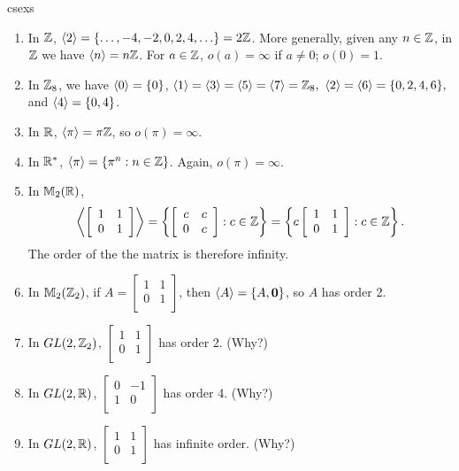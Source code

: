 \begin{example}{csexs}\

\begin{enumerate}
\item In $\mathbb{Z}$, $\langle2\rangle=\{\ldots,-4,-2,0,2,4,\ldots\}=2\mathbb{Z}$. More generally, given any $n\in \mathbb{Z}$, in $\mathbb{Z}$ we have $\langle n\rangle=n\mathbb{Z}$. For $a\in \mathbb{Z}$, $o(a)=\infty$ if $a\neq 0$; $o(0)=1$.

\item In $\mathbb{Z}_8$, we have $\langle0\rangle=\{0\}$, $\langle1\rangle=\langle3\rangle=\langle5\rangle=\langle7\rangle=\mathbb{Z}_8,$ $\langle2\rangle=\langle6\rangle=\{0,2,4,6\},$ and $\langle4\rangle=\{0,4\}$.
\item In $\mathbb{R}$, $\langle\pi\rangle=\pi\mathbb{Z}$, so $o(\pi)=\infty$.
\item In $\mathbb{R}^*$, $\langle\pi\rangle=\{\pi^n:n\in \mathbb{Z}\}$. Again, $o(\pi)=\infty$.
\item In $\mathbb{M}_2(\mathbb{R})$,
$$\left\langle\left[
    \begin{array}{cc}
      1 & 1 \\
      0 & 1 \\
    \end{array}
  \right]\right\rangle=\left\{\left[
    \begin{array}{cc}
      c & c \\
      0 & c \\
    \end{array}
  \right] : c\in \mathbb{Z} \right\}= \left\{c\left[
    \begin{array}{cc}
     1 & 1 \\
      0 & 1 \\
    \end{array}
  \right] : c\in \mathbb{Z} \right\}.$$ The order of the the matrix is therefore infinity.
\item In $\mathbb{M}_2(\mathbb{Z}_2)$, if $A=\left[
    \begin{array}{cc}
      1 & 1 \\
      0 & 1 \\
    \end{array}
  \right]$, then $\langle A\rangle=\{A, \mathbf 0\}$, so $A$ has order 2.
\item In $GL(2,\mathbb{Z}_2)$, $\left[
    \begin{array}{cc}
      1 & 1 \\
      0 & 1 \\
    \end{array}
  \right]$ has order 2. (Why?)
\item In $GL(2,\mathbb{R})$, $\left[
    \begin{array}{cr}
      0 & -1 \\
      1 & 0 \\
    \end{array}
  \right]$ has order 4. (Why?)
\item In $GL(2,\mathbb{R})$, $\left[
    \begin{array}{cc}
      1 & 1 \\
      0 & 1 \\
    \end{array}
  \right]$ has infinite order. (Why?)


\end{enumerate}
\end{example}
